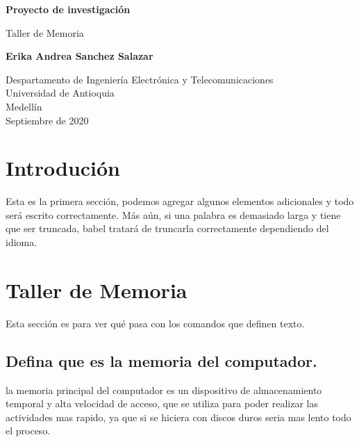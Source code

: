 \documentclass{article}
\begin{document}
\begin{titlepage}
    \begin{center}
        \vspace*{1cm}
            
        \Huge
        \textbf{Proyecto de investigación}
            
        \vspace{0.5cm}
        \LARGE
        Taller de Memoria
            
        \vspace{1.5cm}
            
        \textbf{Erika Andrea Sanchez Salazar}
            
        \vfill
            
        \vspace{0.8cm}
            
        \Large
        Despartamento de Ingeniería Electrónica y Telecomunicaciones\\
        Universidad de Antioquia\\
        Medellín\\
        Septiembre de 2020
            
    \end{center}
\end{titlepage}

\tableofcontents
\newpage
\section{Introdución}\label{intro}
Esta es la primera sección, podemos agregar algunos elementos adicionales y todo será escrito correctamente. Más aún, si una palabra es demasiado larga y tiene que ser truncada, babel tratará de truncarla correctamente dependiendo del idioma.

\section{Taller de Memoria} \label{contenido}
Esta sección es para ver qué pasa con los comandos que definen texto.
\subsection{Defina que es la memoria del computador.}
la memoria principal del computador es un dispositivo de almacenamiento temporal y alta velocidad de acceso, que se utiliza para poder realizar las actividades mas rapido, ya que si se hiciera con discos duros seria mas lento todo el proceso.
\end{document}

